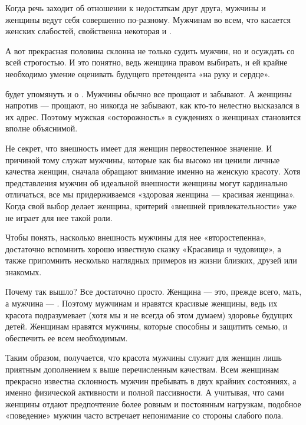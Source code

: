 Когда речь заходит об отношении к недостаткам друг друга, мужчины и женщины ведут себя совершенно по-разному. Мужчинам во всем, что касается женских слабостей, свойственна некоторая  и .

А вот прекрасная половина склонна не только судить мужчин, но и осуждать со всей строгостью. И это понятно, ведь женщина  правом выбирать, и ей крайне необходимо умение оценивать будущего претендента «на руку и сердце».

 будет упомянуть и о . Мужчины обычно все прощают и забывают. А женщины напротив --- прощают, но никогда не забывают, как кто-то нелестно высказался в их адрес. Поэтому мужская «осторожность» в суждениях о женщинах становится вполне объяснимой.

Не секрет, что внешность имеет для женщин первостепенное значение. И причиной тому служат мужчины, которые как бы высоко ни ценили личные качества женщин, сначала обращают внимание именно на женскую красоту. Хотя представления мужчин об идеальной внешности женщины могут кардинально отличаться, все мы придерживаемся   «здоровая женщина --- красивая женщина». Когда свой выбор делает женщина, критерий «внешней привлекательности» уже не играет для нее такой роли.

Чтобы понять, насколько внешность мужчины для нее «второстепенна», достаточно вспомнить хорошо известную сказку «Красавица и чудовище», а также припомнить несколько наглядных примеров из жизни близких, друзей или знакомых.

Почему так вышло? Все достаточно просто. Женщина --- это, прежде всего, мать, а мужчина --- . Поэтому мужчинам и нравятся красивые женщины, ведь их красота подразумевает (хотя мы и не всегда об этом думаем) здоровье будущих детей. Женщинам нравятся мужчины, которые способны и защитить семью, и обеспечить ее всем необходимым.

Таким образом, получается, что красота мужчины служит для женщин лишь приятным дополнением к выше перечисленным качествам. Всем женщинам прекрасно известна склонность мужчин пребывать в двух крайних состояниях, а именно физической активности и полной пассивности. А учитывая, что сами женщины отдают предпочтение более ровным и постоянным нагрузкам, подобное «поведение» мужчин часто встречает непонимание со стороны слабого пола.

